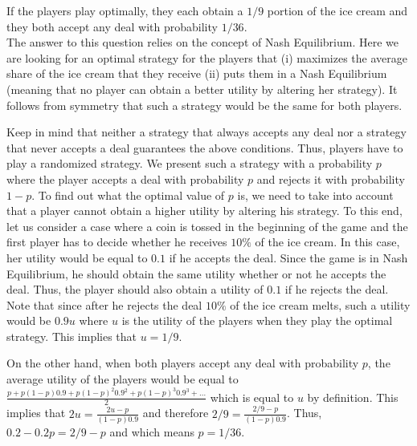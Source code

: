 \begin{solution}
If the players play optimally, they each obtain a $1/9$ portion of the ice cream and they both accept any deal with probability $1/36$.\\[0.2cm]

The answer to this question relies on the concept of Nash Equilibrium. Here we are looking for an optimal strategy for the players that (i) maximizes the average share of the ice cream that they receive (ii) puts them in a Nash Equilibrium (meaning that no player can obtain a better utility by altering her strategy). It follows from symmetry that such a strategy would be the same for both players.

Keep in mind that neither a strategy that always accepts any deal nor a strategy that never accepts a deal guarantees the above conditions. Thus, players have to play a randomized strategy. We present such a strategy with a probability $p$ where the player accepts a deal with probability $p$ and rejects it with probability $1-p$. To find out what the optimal value of $p$ is, we need to take into account that a player cannot obtain a higher utility by altering his strategy. To this end, let us consider a case where a coin is tossed in the beginning of the game and the first player has to decide whether he receives $10\%$ of the ice cream. In this case, her utility would be equal to $0.1$ if he accepts the deal. Since the game is in Nash Equilibrium, he should obtain the same utility whether or not he accepts the deal. Thus, the player should also obtain a utility of $0.1$ if he rejects the deal. Note that since after he rejects the deal $10\%$ of the ice cream melts, such a utility would be $0.9u$ where $u$ is the utility of the players when they play the optimal strategy. This implies that $u = 1/9$.

On the other hand, when both players accept any deal with probability $p$, the average utility of the players would be equal to $\frac{p + p(1-p)  0.9 + p(1-p)^2 0.9^2 + p(1-p)^3 0.9^3 + \ldots}{2}$ which is equal to $u$ by definition. This implies that $2u = \frac{2u-p}{(1-p)0.9}$ and therefore $2/9 = \frac{2/9 - p}{(1-p)0.9}$. Thus, $0.2 - 0.2 p = 2/9 - p$ and which means $p = 1/36$.

\end{solution}
